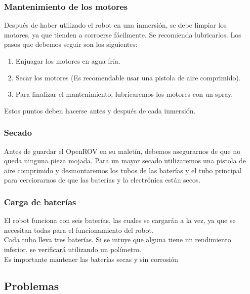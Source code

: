 \subsubsection{Mantenimiento de los motores}
\label{subsubsec:mantenimiento}
Después de haber utilizado el robot en una inmersión, se debe limpiar los motores, ya que tienden a corroerse fácilmente. Se recomienda lubricarlos.
Los pasos que debemos seguir son los siguientes:
\begin{enumerate}
\item Enjuagar los motores en agua fría.
\item Secar los motores (Es recomendable usar una pistola de aire comprimido).
\item Para finalizar el mantenimiento, lubricaremos los motores con un spray.
\end{enumerate}
Estos puntos deben hacerse antes y después de cada inmersión.
  
\subsubsection{Secado}
\label{subsubsec:secado}
Antes de guardar el OpenROV en su maletín, debemos asegurarnos de que no queda ninguna pieza mojada.
Para un mayor secado utilizaremos una pistola de aire comprimido y desmontaremos los tubos de las baterías y el tubo principal para cerciorarnos de que las baterías y la electrónica están secos.
  
\subsubsection{Carga de baterías}
\label{subsubsec:bateria}
El robot funciona con seis baterías, las cuales se cargarán a la vez, ya que se necesitan todas para el funcionamiento del robot.
\\Cada tubo lleva tres baterías. Si se intuye que alguna tiene un rendimiento inferior, se verificará utilizando un polímetro.
\\Es importante mantener las baterías secas y sin corrosión

\subsection{Problemas}
\label{subsec:problemas}

